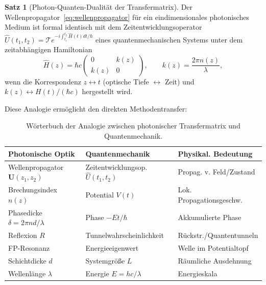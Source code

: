 ﻿\documentclass[a4paper,12pt]{article}
\theoremstyle{definition}
\newtheorem{satz}{Satz}[section]
\newcommand{\matr}[1]{\mathbf{#1}}
\begin{document}
	\begin{satz}[Photon-Quanten-Dualität der Transfermatrix]
		\label{satz:qm-analogie}
		Der Wellenpropagator~\eqref{eq:wellenpropagator} für ein eindimensionales
		photonisches Medium ist formal identisch mit dem Zeitentwicklungsoperator
		$\hat{U}(t_1, t_2) = \mathcal{T}e^{-i\int_{t_1}^{t_2} \hat{H}(t) dt/\hbar}$
		eines quantenmechanischen Systems unter dem zeitabhängigen Hamiltonian
		\begin{equation}
			\hat{H}(z) = \hbar c \begin{pmatrix} 0 & k(z) \\ k(z) & 0 \end{pmatrix},
			\qquad k(z) = \frac{2\pi n(z)}{\lambda},
			\label{eq:effektiver-hamiltonian}
		\end{equation}
		wenn die Korrespondenz $z \leftrightarrow t$ (optische Tiefe $\leftrightarrow$ Zeit)
		und $k(z) \leftrightarrow H(t)/(\hbar c)$ hergestellt wird.
	\end{satz}
	
	Diese Analogie ermöglicht den direkten Methodentransfer:
	
	\begin{table}[htb]
		\centering
		\caption{Wörterbuch der Analogie zwischen photonischer Transfermatrix
			und Quantenmechanik.}
		\label{tab:analogie}
		\begin{tabular}{lll}
			\toprule
			\textbf{Photonische Optik} & \textbf{Quantenmechanik} & \textbf{Physikal. Bedeutung}\\
			\midrule
			Wellenpropagator $\matr{U}(z_1,z_2)$ & Zeitentwicklungsop. $\hat{U}(t_1,t_2)$
			& Propag. v. Feld/Zustand\\
			Brechungsindex $n(z)$ & Potential $V(t)$ & Lok. Propagationsgeschw.\\
			Phasedicke $\delta = 2\pi nd/\lambda$ & Phase $-Et/\hbar$ & Akkumulierte Phase\\
			Reflexion $R$ & Tunnelwahrscheinlichkeit & Rückstr./Quantentunneln\\
			FP-Resonanz & Energieeigenwert & Welle im Potentialtopf\\
			Schichtdicke $d$ & Systemgröße $L$ & Räumliche Ausdehnung\\
			Wellenlänge $\lambda$ & Energie $E = hc/\lambda$ & Energieskala\\
			\bottomrule
		\end{tabular}
	\end{table}
	
\end{document}
